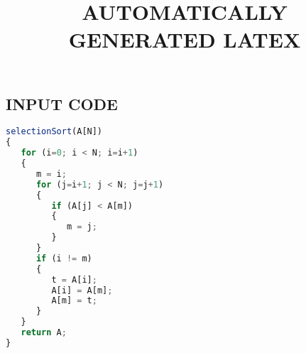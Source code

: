 \documentclass{article}
\begin{document}
\title{AUTOMATICALLY GENERATED LATEX}
\maketitle

\subsection{INPUT CODE}
\begin{lstlisting}[language=JavaScript]
selectionSort(A[N])
{
   for (i=0; i < N; i=i+1)
   {
      m = i;
      for (j=i+1; j < N; j=j+1)
      {
         if (A[j] < A[m])
         {
            m = j;
         }
      }
      if (i != m)
      {
         t = A[i];
         A[i] = A[m];
         A[m] = t;
      }
   }
   return A;
}

\end{lstlisting}
\end{document}
